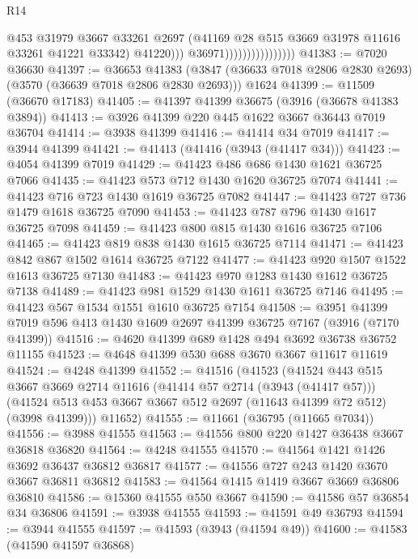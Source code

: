 \begin{lexlean}{R14}
\begin{coremodule}
                                          @453
                                          @31979
                                          @3667
                                          @33261
                                          @2697
                                          (@41169 @28 @515 @3669 @31978 @11616 @33261 @41221 @33342)
                                          @41220)))
                                    @36971))))))))))))))))
@41383 := @7020 @36630
@41397 := @36653
    @41383
    (@3847 (@36633 @7018 @2806 @2830 @2693) (@3570 (@36639 @7018 @2806 @2830 @2693)))
    @1624
@41399 := @11509 (@36670 @17183)
@41405 := @41397 @41399 @36675 (@3916 (@36678 @41383 @3894))
@41413 := @3926 @41399 @220 @445 @1622 @3667 @36443 @7019 @36704
@41414 := @3938 @41399
@41416 := @41414 @34 @7019
@41417 := @3944 @41399
@41421 := @41413 (@41416 (@3943 (@41417 @34)))
@41423 := @4054 @41399 @7019
@41429 := @41423 @486 @686 @1430 @1621 @36725 @7066
@41435 := @41423 @573 @712 @1430 @1620 @36725 @7074
@41441 := @41423 @716 @723 @1430 @1619 @36725 @7082
@41447 := @41423 @727 @736 @1479 @1618 @36725 @7090
@41453 := @41423 @787 @796 @1430 @1617 @36725 @7098
@41459 := @41423 @800 @815 @1430 @1616 @36725 @7106
@41465 := @41423 @819 @838 @1430 @1615 @36725 @7114
@41471 := @41423 @842 @867 @1502 @1614 @36725 @7122
@41477 := @41423 @920 @1507 @1522 @1613 @36725 @7130
@41483 := @41423 @970 @1283 @1430 @1612 @36725 @7138
@41489 := @41423 @981 @1529 @1430 @1611 @36725 @7146
@41495 := @41423 @567 @1534 @1551 @1610 @36725 @7154
@41508 := @3951 @41399 @7019 @596 @413 @1430 @1609 @2697 @41399 @36725 @7167 (@3916 (@7170 @41399))
@41516 := @4620 @41399 @689 @1428 @494 @3692 @36738 @36752 @11155
@41523 := @4648 @41399 @530 @688 @3670 @3667 @11617 @11619
@41524 := @4248 @41399
@41552 := @41516
    (@41523
      (@41524
        @443
        @515
        @3667
        @3669
        @2714
        @11616
        (@41414 @57 @2714 (@3943 (@41417 @57)))
        (@41524 @513 @453 @3667 @3667 @512 @2697 (@11643 @41399 @72 @512) (@3998 @41399)))
      @11652)
@41555 := @11661 (@36795 (@11665 @7034))
@41556 := @3988 @41555
@41563 := @41556 @800 @220 @1427 @36438 @3667 @36818 @36820
@41564 := @4248 @41555
@41570 := @41564 @1421 @1426 @3692 @36437 @36812 @36817
@41577 := @41556 @727 @243 @1420 @3670 @3667 @36811 @36812
@41583 := @41564 @1415 @1419 @3667 @3669 @36806 @36810
@41586 := @15360 @41555 @550 @3667
@41590 := @41586 @57 @36854 @34 @36806
@41591 := @3938 @41555
@41593 := @41591 @49 @36793
@41594 := @3944 @41555
@41597 := @41593 (@3943 (@41594 @49))
@41600 := @41583 (@41590 @41597 @36868)

\end{coremodule}
\end{lexlean}

